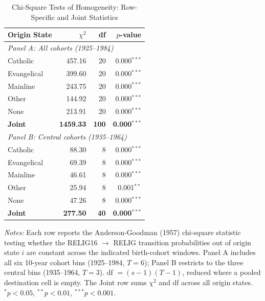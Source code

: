 \begin{table}[htbp]
\centering
\caption{Chi-Square Tests of Homogeneity: Row-Specific and Joint Statistics}
\label{tab:stationarity}
\begin{tabular}{lrrr}
\toprule
Origin State & $\chi^2$ & df & $p$-value \\
\midrule
\multicolumn{4}{l}{\textit{Panel A: All cohorts (1925--1984)}} \\
\midrule
Catholic & 457.16 & 20 & 0.000$^{***}$ \\
Evangelical & 399.60 & 20 & 0.000$^{***}$ \\
Mainline & 243.75 & 20 & 0.000$^{***}$ \\
Other & 144.92 & 20 & 0.000$^{***}$ \\
None & 213.91 & 20 & 0.000$^{***}$ \\
\textbf{Joint} & \textbf{1459.33} & \textbf{100} & \textbf{0.000}$^{***}$ \\
\midrule
\multicolumn{4}{l}{\textit{Panel B: Central cohorts (1935--1964)}} \\
\midrule
Catholic & 88.30 & 8 & 0.000$^{***}$ \\
Evangelical & 69.39 & 8 & 0.000$^{***}$ \\
Mainline & 46.61 & 8 & 0.000$^{***}$ \\
Other & 25.94 & 8 & 0.001$^{**}$ \\
None & 47.26 & 8 & 0.000$^{***}$ \\
\textbf{Joint} & \textbf{277.50} & \textbf{40} & \textbf{0.000}$^{***}$ \\
\bottomrule
\end{tabular}
\begin{minipage}{\linewidth}
\vspace{0.5em}\footnotesize
\textit{Notes:} Each row reports the Anderson-Goodman (1957) chi-square statistic
testing whether the RELIG16 $\to$ RELIG transition probabilities out of origin
state $i$ are constant across the indicated birth-cohort windows. Panel A includes
all six 10-year cohort bins (1925--1984, $T=6$); Panel B restricts to the three
central bins (1935--1964, $T=3$). df $= (s-1)(T-1)$, reduced where a pooled
destination cell is empty. The Joint row sums $\chi^2$ and df across all origin
states. $^{*}p<0.05$, $^{**}p<0.01$, $^{***}p<0.001$.
\end{minipage}
\end{table}
